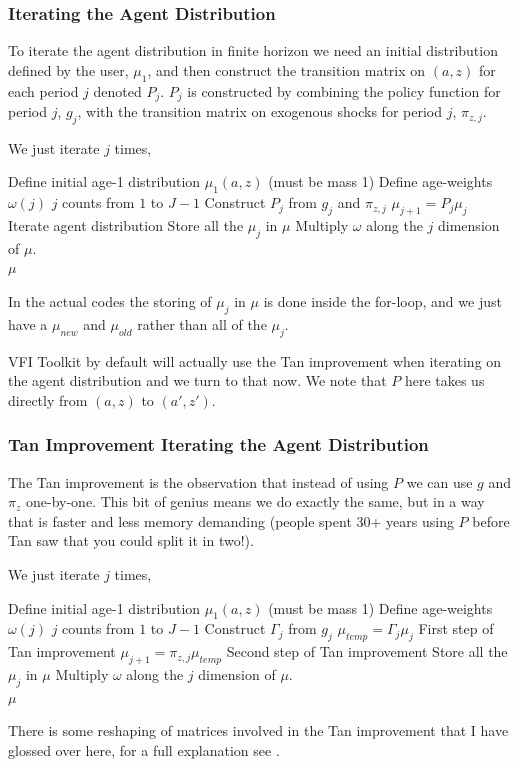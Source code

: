 \subsubsection{Iterating the Agent Distribution}
To iterate the agent distribution in finite horizon we need an initial distribution defined by the user, $\mu_1$, and then construct the transition matrix on $(a,z)$ for each period $j$ denoted $P_j$. $P_j$ is constructed by combining the policy function for period $j$, $g_j$, with the transition matrix on exogenous shocks for period $j$, $\pi_{z,j}$.

We just iterate $j$ times,
\begin{algorithmic}
 \State Define initial age-1 distribution $\mu_1(a,z)$ (must be mass 1)
 \State Define age-weights $\omega(j)$
 \For $j$ counts from $1$ to $J-1$
  \State Construct $P_j$ from $g_j$ and $\pi_{z,j}$
  \State $\mu_{j+1}=P_j \mu_j$ \Comment Iterate agent distribution
 \EndFor
 \State Store all the $\mu_j$ in $\mu$
  \State Multiply $\omega$ along the $j$ dimension of $\mu$.
 \\ \Return $\mu$
 \end{algorithmic}
In the actual codes the storing of $\mu_j$ in $\mu$ is done inside the for-loop, and we just have a $\mu_{new}$ and $\mu_{old}$ rather than all of the $\mu_j$.

VFI Toolkit by default will actually use the Tan improvement when iterating on the agent distribution and we turn to that now. We note that $P$ here takes us directly from $(a,z)$ to $(a',z')$.

\subsubsection{Tan Improvement Iterating the Agent Distribution}
The Tan improvement is the observation that instead of using $P$ we can use $g$ and $\pi_z$ one-by-one. This bit of genius means we do exactly the same, but in a way that is faster and less memory demanding (people spent 30+ years using $P$ before Tan saw that you could split it in two!).

We just iterate $j$ times,
\begin{algorithmic}
 \State Define initial age-1 distribution $\mu_1(a,z)$ (must be mass 1)
 \State Define age-weights $\omega(j)$
 \For $j$ counts from $1$ to $J-1$
  \State Construct $\Gamma_j$ from $g_j$
  \State $\mu_{temp}=\Gamma_j \mu_j$ \Comment First step of Tan improvement
  \State $\mu_{j+1}=\pi_{z,j} \mu_{temp}$ \Comment Second step of Tan improvement
 \EndFor
 \State Store all the $\mu_j$ in $\mu$
  \State Multiply $\omega$ along the $j$ dimension of $\mu$.
 \\ \Return $\mu$
 \end{algorithmic}
There is some reshaping of matrices involved in the Tan improvement that I have glossed over here, for a full explanation see \cite{Tan2020}.

